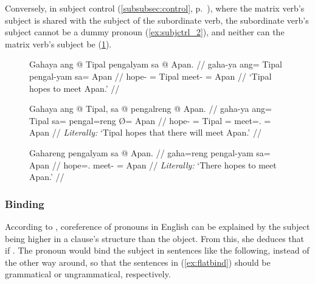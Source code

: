Conversely, in subject control (\autoref{subsubsec:control}, 
p.~\pageref{subsubsec:control}), where the matrix verb's subject is shared with
the subject of the subordinate verb, the subordinate verb's subject cannot
be a dummy pronoun (\ref{ex:subjctrl_2}), and neither can the matrix verb's
subject be (\ref{ex:subjctrl_3}).

\begin{figure}
\pex\label{ex:subjctrl}
\a\label{ex:subjctrl_1}\begingl
	\gla Gahaya ang @ Tipal pengalyam sa @ Apan. //
	\glb gaha-ya ang= Tipal pengal-yam sa= Apan //
	\glc hope-\TsgM{} \Aarg{}= Tipal meet-\Ptcp{} \Parg{}= Apan //
	\glft `Tipal hopes to meet Apan.' //
\endgl

\a\label{ex:subjctrl_2}\ljudge*\begingl
	\gla Gahaya ang @ Tipal, sa @ pengalreng {} @ Apan. //
	\glb gaha-ya ang= Tipal sa= pengal=reng Ø= Apan //
	\glc hope-\TsgM{} \Aarg{}= Tipal \PatT{}= meet=\TsgI{}.\Aarg{} \Top{}=
		Apan //
	\glft \textit{Literally:} `Tipal hopes that there will meet Apan.' //
\endgl

\a\label{ex:subjctrl_3}\ljudge*\begingl
	\gla Gahareng pengalyam sa @ Apan. //
	\glb gaha=reng pengal-yam sa= Apan //
	\glc hope=\TsgI{}.\Aarg{} meet-\Ptcp{} \Parg{}= Apan //
	\glft \textit{Literally:} `There hopes to meet Apan.' //
\endgl
\xe
\end{figure}

\subsubsection{Binding}

According to \citep{speas1990}, coreference of pronouns in English can be
explained by the subject being higher in a clause's structure than the object.
From this, she deduces that if . The pronoun would bind the
subject in sentences like the following, instead of the other way around, so
that the sentences in (\ref{ex:flatbind}) should be grammatical or
ungrammatical, respectively.

\begin{figure}[h]
\pex\label{ex:flatbind}
	\a\label{ex:flatbind_1} 
	\a\label{ex:flatbind_2} \ljudge* {}
	\a\label{ex:flatbind_3} 
	\a\label{ex:flatbind_4} \ljudge* {}
\xe
\end{figure}

